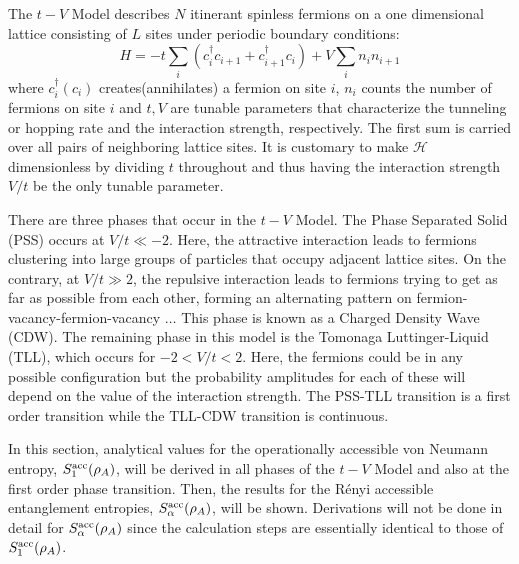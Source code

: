 The $t-V$ Model describes $N$ itinerant spinless fermions on a one dimensional lattice consisting of $L$ sites under periodic boundary conditions:
%
\begin{equation}
H = -t \sum_{i} \left ( c_{i}^{\dag} c_{i+1} + c_{i+1}^{\dag} c_{i} \right )+ V \sum_{i} n_i n_{i+1} 
\label{eq:t-VModel}
\end{equation}
%
where $c^{\dag}_i(c_{i})$ creates(annihilates) a fermion on site $i$, $n_i$ counts the number of fermions on site $i$ and $t,V$ are tunable parameters that characterize the tunneling or hopping rate and the interaction strength, respectively. The first sum is carried over all pairs of neighboring lattice sites. It is customary to make $\mathcal{H}$ dimensionless by dividing $t$ throughout and thus having the interaction strength $V/t$ be the only tunable parameter.

There are three phases that occur in the $t-V$ Model. The Phase Separated Solid (PSS) occurs at $V/t \ll -2$. Here, the attractive interaction leads to fermions clustering into large groups of particles that occupy adjacent lattice sites. On the contrary, at $V/t \gg 2$, the repulsive interaction leads to fermions trying to get as far as possible from each other, forming an alternating pattern on fermion-vacancy-fermion-vacancy $\dots$ This phase is known as a Charged Density Wave (CDW). The remaining phase in this model is the Tomonaga Luttinger-Liquid (TLL), which occurs for $-2 < V/t < 2$. Here, the fermions could be in any possible configuration but the probability amplitudes for each of these will depend on the value of the interaction strength. The PSS-TLL transition is a first order transition while the TLL-CDW transition is continuous.

In this section, analytical values for the operationally accessible von Neumann entropy, $S_{1}^{\rm acc}(\rho_A)$, will be derived in all phases of the $t-V$ Model and also at the first order phase transition. Then, the results for the R\'enyi accessible entanglement entropies, $S_{\alpha}^{\rm acc}(\rho_A)$, will be shown. Derivations will not be done in detail for $S_{\alpha}^{\rm acc}(\rho_A)$ since the calculation steps are essentially identical to those of $S_{1}^{\rm acc}(\rho_A)$.

